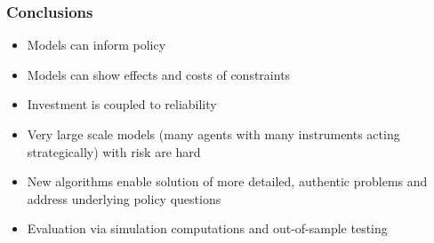 \documentclass[xcolor=dvipsnames]{beamer}
\begin{document}
\begin{frame}
  \frametitle{Conclusions}
  \begin{itemize}
  \item Models can inform policy
  \item Models can show effects and costs of constraints
  \item Investment is coupled to reliability
  \item \color{black} Very large scale models (many agents with many instruments
    acting strategically) with risk are hard
  \item \alert{New algorithms enable solution of more detailed,
      authentic problems and address underlying policy questions}
  \item Evaluation via simulation computations and out-of-sample testing
  \end{itemize}
\end{frame}
\end{document}
